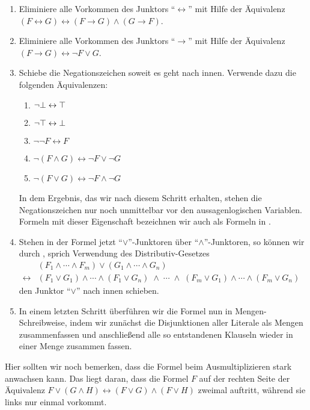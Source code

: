 \begin{enumerate}
\item Eliminiere alle Vorkommen des Junktors ``$\leftrightarrow$'' mit Hilfe der Äquivalenz \\[0.2cm]
      \hspace*{1.3cm} 
      $(F \leftrightarrow G) \leftrightarrow (F \rightarrow G) \wedge (G \rightarrow F)$.
\item Eliminiere alle Vorkommen des Junktors ``$\rightarrow$'' mit Hilfe der Äquivalenz \\[0.2cm]
      \hspace*{1.3cm} 
      $(F \rightarrow G) \leftrightarrow \neg F \vee G$.
\item Schiebe die Negationszeichen soweit es geht nach innen.  Verwende dazu die folgenden Äquivalenzen:
      \begin{enumerate}
      \item $\neg \bot \leftrightarrow \top$
      \item $\neg \top \leftrightarrow \bot$
      \item $\neg \neg F \leftrightarrow F$
      \item $\neg (F \wedge G) \leftrightarrow  \neg F \vee \neg G$ 
      \item $\neg (F \vee   G) \leftrightarrow  \neg F \wedge \neg G$ 
      \end{enumerate}
      In dem Ergebnis, das wir nach diesem Schritt erhalten, stehen die Negationszeichen
      nur noch unmittelbar vor den aussagenlogischen Variablen.  Formeln mit dieser
      Eigenschaft bezeichnen wir auch als Formeln in .
\item Stehen in der Formel jetzt ``$\vee$''-Junktoren über ``$\wedge$''-Junktoren, so können wir durch
      , sprich Verwendung des Distributiv-Gesetzes \\[0.2cm]
      \hspace*{1.3cm} 
      $
      \begin{array}{cl}
                      & (F_1 \wedge \cdots \wedge F_m) \vee (G_1 \wedge \cdots \wedge G_n) \\[0.2cm]
      \leftrightarrow & (F_1 \vee G_1) \wedge \cdots \wedge (F_1 \vee G_n) \;\wedge \;\cdots\; \wedge\;
                        (F_m \vee G_1) \wedge \cdots \wedge (F_m \vee G_n)
      \end{array}
      $
      \\[0.2cm]
      den Junktor ``$\vee$'' nach innen schieben.
\item In einem letzten Schritt überführen wir die Formel nun in Mengen-Schreibweise, indem
      wir zunächst die Disjunktionen aller Literale als Mengen zusammenfassen und anschließend
      alle so entstandenen Klauseln wieder in einer Menge zusammen fassen.
\end{enumerate}
Hier sollten wir noch bemerken, dass die Formel beim Ausmultiplizieren stark anwachsen kann.
Das liegt daran, dass die Formel $F$ auf der rechten Seite der Äquivalenz 
$F \vee (G \wedge H) \leftrightarrow (F \vee G) \wedge (F \vee H)$ zweimal auftritt, während sie
links nur einmal vorkommt. 

